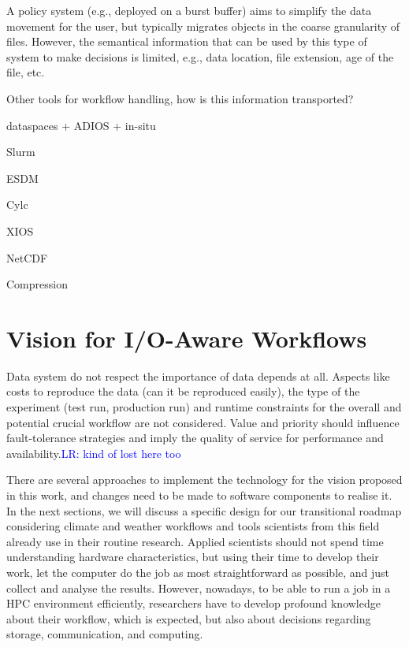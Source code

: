 \documentclass{superfri}
\newcommand{\jk}[1]{\todo[inline]{JK: #1}}
\newcommand{\lr}[1]{\textcolor{blue}{LR: #1}}
\begin{document}
A policy system (e.g., deployed on a burst buffer) aims to simplify the data movement for the user, but typically migrates objects in the coarse granularity of files.
However, the semantical information that can be used by this type of system to make decisions is limited, e.g., data location, file extension, age of the file, etc.

Other tools for workflow handling, how is this information transported?

dataspaces + ADIOS + in-situ

\jk{TODO}

\cite{Vladimirov2014FileIO}

Slurm \cite{Jette02slurm:simple}

ESDM \cite{esdm}

Cylc \cite{8675433}

XIOS \cite{xios}

NetCDF \cite{Jenter92netcdf:a}

Compression \cite{TDTSOCAFQC17}

\section{Vision for I/O-Aware Workflows}
\label{sec:vision}

Data system do not respect the importance of data depends at all. Aspects like costs to reproduce the data (can it be reproduced easily), the type of the experiment (test run, production run) and runtime constraints for the overall and potential crucial workflow are not considered.
Value and priority should influence fault-tolerance strategies and imply the quality of service for performance and availability.\lr{kind of lost here too}

There are several approaches to implement the technology for the vision proposed in this work, and changes need to be made to software components to realise it.
In the next sections, we will discuss a specific design for our transitional roadmap considering climate and weather workflows and tools scientists from this field already use in their routine research.
Applied scientists should not spend time understanding hardware characteristics, but using their time to develop their work, let the computer do the job as most straightforward as possible, and just collect and analyse the results.
However, nowadays, to be able to run a job in a HPC environment efficiently, researchers have to develop profound knowledge about their workflow, which is expected, but also about decisions regarding storage, communication, and computing.
\end{document}
